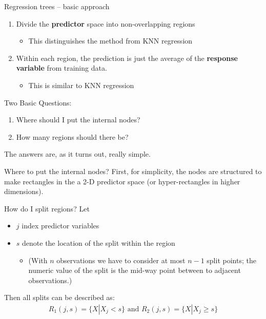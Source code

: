 \documentclass[mathserif, aspectratio=169]{beamer}
\begin{document}
\begin{frame}{Regression trees -- basic approach}

\begin{enumerate}
\item Divide the \textbf{predictor} space into non-overlapping regions
\begin{itemize}
\item This distinguishes the method from KNN regression
\end{itemize}
\item Within each region, the prediction is just the average of the \textbf{response variable} from training data.
\begin{itemize}
\item This is similar to KNN regression
\end{itemize}
\end{enumerate}

\pause

Two Basic Questions:

\begin{enumerate}
\item Where should I put the internal nodes?
\item How many regions should there be?
\end{enumerate}

The answers are, as it turns out, really simple.  

\end{frame}

\begin{frame}{Where to put the internal nodes?}
First, for simplicity, the nodes are structured to make rectangles in the a 2-D predictor space (or hyper-rectangles in higher dimensions).  

\end{frame}

\begin{frame}{How do I split regions?}
Let 
\begin{itemize}
\item $j$ index predictor variables
\item $s$ denote the location of the split within the region
\begin{itemize}
\item (With $n$ observations we have to consider at most $n-1$ split points; the numeric value of the split is the mid-way point between to adjacent observations.)
\end{itemize}
\end{itemize}

\vspace{5mm}

Then all splits can be described as:
\begin{align*}
R_1(j,s) = \{X|X_j<s\} \text{ and } R_2(j,s) = \{X|X_j\ge s\} 
\end{align*}
\end{frame}
\end{document}
